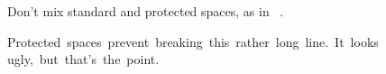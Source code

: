 Don't mix standard and protected spaces, as in ~\cite{smith14}.

Protected~spaces~prevent~breaking~this~rather~long~line.~It~looks~
ugly,~but~that's~the~point.
